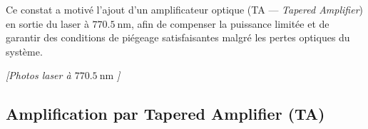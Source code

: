 \medskip

Ce constat a motivé l’ajout d’un amplificateur optique (TA — \emph{Tapered Amplifier}) en sortie du laser à $770.5~\text{nm}$, afin de compenser la puissance limitée et de garantir des conditions de piégeage satisfaisantes malgré les pertes optiques du système.



\begin{center}
\textit{[Photos laser à $770.5~\text{nm}$ ]}
\end{center}


\subsection{Amplification par Tapered Amplifier (TA)}

